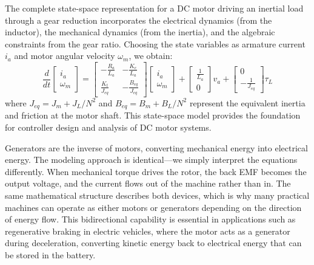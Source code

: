 The complete state-space representation for a DC motor driving an inertial load through a gear reduction incorporates the electrical dynamics (from the inductor), the mechanical dynamics (from the inertia), and the algebraic constraints from the gear ratio. Choosing the state variables as armature current $i_a$ and motor angular velocity $\omega_m$, we obtain:
\begin{equation}
\frac{d}{dt}\begin{bmatrix} i_a \\ \omega_m \end{bmatrix} = \begin{bmatrix} -\frac{R_a}{L_a} & -\frac{K_e}{L_a} \\ \frac{K_t}{J_{eq}} & -\frac{B_{eq}}{J_{eq}} \end{bmatrix} \begin{bmatrix} i_a \\ \omega_m \end{bmatrix} + \begin{bmatrix} \frac{1}{L_a} \\ 0 \end{bmatrix} v_a + \begin{bmatrix} 0 \\ -\frac{1}{J_{eq}} \end{bmatrix} \tau_L
\end{equation}
where $J_{eq} = J_m + J_L / N^2$ and $B_{eq} = B_m + B_L / N^2$ represent the equivalent inertia and friction at the motor shaft. This state-space model provides the foundation for controller design and analysis of DC motor systems.

Generators are the inverse of motors, converting mechanical energy into electrical energy. The modeling approach is identical—we simply interpret the equations differently. When mechanical torque drives the rotor, the back EMF becomes the output voltage, and the current flows out of the machine rather than in. The same mathematical structure describes both devices, which is why many practical machines can operate as either motors or generators depending on the direction of energy flow. This bidirectional capability is essential in applications such as regenerative braking in electric vehicles, where the motor acts as a generator during deceleration, converting kinetic energy back to electrical energy that can be stored in the battery.

